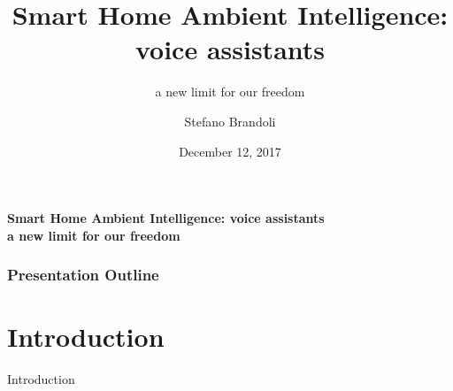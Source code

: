 \documentclass{beamer}
\title{Smart Home Ambient Intelligence: \\voice assistants}
\subtitle{\vspace*{0.3cm}a new limit for our freedom}
\author[Stefano Brandoli]{Stefano Brandoli}
\institute[PoliMi]{Politecnico di Milano\\Computer Ethics 2017/2018}
\date{December 12, 2017}
\begin{document}
\begin{frame}
\maketitle
\end{frame}

\begin{frame}
\begin{center}\vspace*{-0.5cm}\textbf{Smart Home Ambient Intelligence: voice assistants\\a new limit for our freedom}
\end{center}
\frametitle{Presentation Outline}
\tableofcontents
\end{frame}

\section{Introduction}

\begin{frame}
\begin{center}
	 Introduction
\end{center}
\end{frame}
\end{document}
